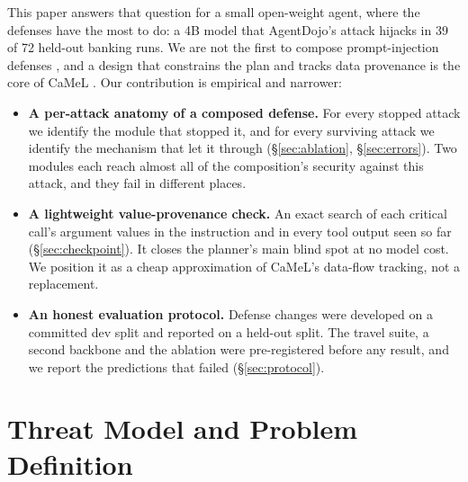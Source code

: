 \documentclass[11pt]{article}
\begin{document}
This paper answers that question for a small open-weight agent, where the defenses have the most to do: a 4B model that AgentDojo's attack hijacks in 39 of 72 held-out banking runs. We are not the first to compose prompt-injection defenses \citep{ramakrishnan2025securing}, and a design that constrains the plan and tracks data provenance is the core of CaMeL \citep{debenedetti2025camel}. Our contribution is empirical and narrower:

\begin{itemize}
\setlength\itemsep{0pt}
\item \textbf{A per-attack anatomy of a composed defense.} For every stopped attack we identify the module that stopped it, and for every surviving attack we identify the mechanism that let it through (\S\ref{sec:ablation}, \S\ref{sec:errors}). Two modules each reach almost all of the composition's security against this attack, and they fail in different places.
\item \textbf{A lightweight value-provenance check.} An exact search of each critical call's argument values in the instruction and in every tool output seen so far (\S\ref{sec:checkpoint}). It closes the planner's main blind spot at no model cost. We position it as a cheap approximation of CaMeL's data-flow tracking, not a replacement.
\item \textbf{An honest evaluation protocol.} Defense changes were developed on a committed dev split and reported on a held-out split. The travel suite, a second backbone and the ablation were pre-registered before any result, and we report the predictions that failed (\S\ref{sec:protocol}).
\end{itemize}

\section{Threat Model and Problem Definition}
\label{sec:threat}
\end{document}
